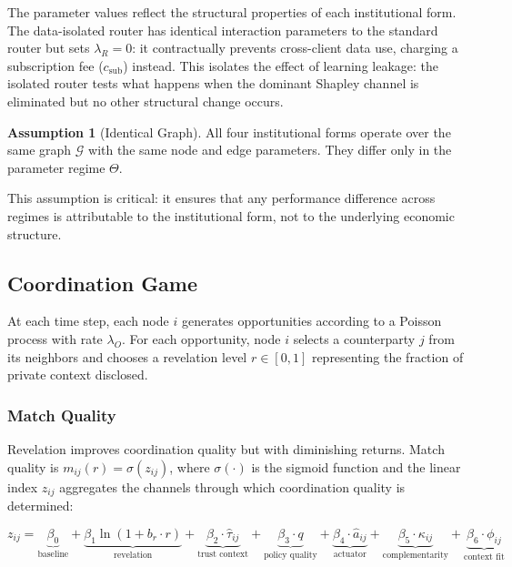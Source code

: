 \documentclass[12pt]{article}
\theoremstyle{definition}
\newtheorem{assumption}{Assumption}
\begin{document}
The parameter values reflect the structural properties of each institutional form. The data-isolated router has identical interaction parameters to the standard router but sets $\lambda_R = 0$: it contractually prevents cross-client data use, charging a subscription fee ($c_{\text{sub}}$) instead. This isolates the effect of learning leakage: the isolated router tests what happens when the dominant Shapley channel is eliminated but no other structural change occurs.

\begin{assumption}[Identical Graph]
\label{ass:identical}
All four institutional forms operate over the same graph $\mathcal{G}$ with the same node and edge parameters. They differ only in the parameter regime $\Theta$.
\end{assumption}

This assumption is critical: it ensures that any performance difference across regimes is attributable to the institutional form, not to the underlying economic structure.

\subsection{Coordination Game}

At each time step, each node $i$ generates opportunities according to a Poisson process with rate $\lambda_O$. For each opportunity, node $i$ selects a counterparty $j$ from its neighbors and chooses a revelation level $r \in [0,1]$ representing the fraction of private context disclosed.

\subsubsection{Match Quality}

Revelation improves coordination quality but with diminishing returns. Match quality is $m_{ij}(r) = \sigma(z_{ij})$, where $\sigma(\cdot)$ is the sigmoid function and the linear index $z_{ij}$ aggregates the channels through which coordination quality is determined:

\begin{equation}
\label{eq:match}
z_{ij} = \underbrace{\beta_0}_{\text{baseline}} + \underbrace{\beta_1 \ln(1 + b_r \cdot r)}_{\text{revelation}} + \underbrace{\beta_2 \cdot \hat{\tau}_{ij}}_{\text{trust context}} + \underbrace{\beta_3 \cdot q}_{\text{policy quality}} + \underbrace{\beta_4 \cdot \hat{a}_{ij}}_{\text{actuator}} + \underbrace{\beta_5 \cdot \kappa_{ij}}_{\text{complementarity}} + \underbrace{\beta_6 \cdot \phi_{ij}}_{\text{context fit}}
\end{equation}
\end{document}
